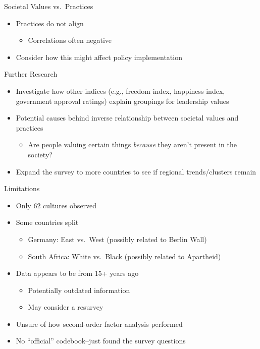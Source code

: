 \documentclass[
  ignorenonframetext,
]{beamer}
\providecommand{\tightlist}{%
  \setlength{\itemsep}{0pt}\setlength{\parskip}{0pt}}
\begin{document}
\begin{frame}{Societal Values vs.~Practices}
\protect\hypertarget{societal-values-vs.-practices}{}
\begin{itemize}
\tightlist
\item
  Practices do not align

  \begin{itemize}
  \tightlist
  \item
    Correlations often negative
  \end{itemize}
\item
  Consider how this might affect policy implementation
\end{itemize}
\end{frame}

\begin{frame}{Further Research}
\protect\hypertarget{further-research}{}
\begin{itemize}
\tightlist
\item
  Investigate how other indices (e.g., freedom index, happiness index,
  government approval ratings) explain groupings for leadership values
\item
  Potential causes behind inverse relationship between societal values
  and practices

  \begin{itemize}
  \tightlist
  \item
    Are people valuing certain things \emph{because} they aren't present
    in the society?
  \end{itemize}
\item
  Expand the survey to more countries to see if regional trends/clusters
  remain
\end{itemize}
\end{frame}

\begin{frame}{Limitations}
\protect\hypertarget{limitations}{}
\begin{itemize}
\tightlist
\item
  Only 62 cultures observed
\item
  Some countries split

  \begin{itemize}
  \tightlist
  \item
    Germany: East vs.~West (possibly related to Berlin Wall)
  \item
    South Africa: White vs.~Black (possibly related to Apartheid)
  \end{itemize}
\item
  Data appears to be from 15+ years ago

  \begin{itemize}
  \tightlist
  \item
    Potentially outdated information
  \item
    May consider a resurvey
  \end{itemize}
\item
  Unsure of how second-order factor analysis performed
\item
  No ``official'' codebook--just found the survey questions
\end{itemize}
\end{frame}
\end{document}
